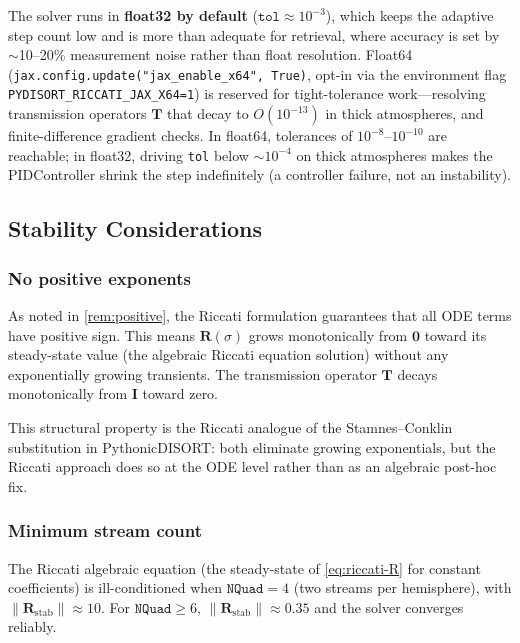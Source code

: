 \documentclass[11pt,a4paper]{article}
\newcommand{\mat}[1]{\mathbf{#1}}
\theoremstyle{definition}
\begin{document}
The solver runs in \textbf{float32 by default} ($\texttt{tol} \approx
10^{-3}$), which keeps the adaptive step count low and is more than
adequate for retrieval, where accuracy is set by $\sim$10--20\%
measurement noise rather than float resolution.  Float64
(\texttt{jax.config.update("jax\_enable\_x64", True)}, opt-in via the
environment flag \texttt{PYDISORT\_RICCATI\_JAX\_X64=1}) is reserved for
tight-tolerance work---resolving transmission operators $\mat{T}$ that
decay to $O(10^{-13})$ in thick atmospheres, and finite-difference
gradient checks.  In float64, tolerances of $10^{-8}$--$10^{-10}$ are
reachable; in float32, driving \texttt{tol} below $\sim$$10^{-4}$ on
thick atmospheres makes the PIDController shrink the step indefinitely
(a controller failure, not an instability).

\subsection{Stability Considerations}\label{sec:stability}

\subsubsection{No positive exponents}

As noted in \cref{rem:positive}, the Riccati formulation guarantees
that all ODE terms have positive sign.  This means $\mat{R}(\sigma)$
grows monotonically from $\mat{0}$ toward its steady-state value (the
algebraic Riccati equation solution) without any exponentially growing
transients.  The transmission operator $\mat{T}$ decays monotonically
from $\mat{I}$ toward zero.

This structural property is the Riccati analogue of the Stamnes--Conklin
substitution in PythonicDISORT: both eliminate growing exponentials,
but the Riccati approach does so at the ODE level rather than as an
algebraic post-hoc fix.

\subsubsection{Minimum stream count}

The Riccati algebraic equation (the steady-state of \eqref{eq:riccati-R}
for constant coefficients) is ill-conditioned when $\texttt{NQuad} = 4$
(two streams per hemisphere), with $\|\mat{R}_{\mathrm{stab}}\| \approx
10$.  For $\texttt{NQuad} \geq 6$, $\|\mat{R}_{\mathrm{stab}}\| \approx
0.35$ and the solver converges reliably.
\end{document}
